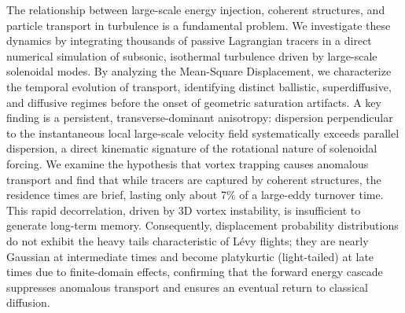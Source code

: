 \documentclass[]{article}
\begin{document}
The relationship between large-scale energy injection, coherent structures, and particle transport in turbulence is a fundamental problem. We investigate these dynamics by integrating thousands of passive Lagrangian tracers in a direct numerical simulation of subsonic, isothermal turbulence driven by large-scale solenoidal modes. By analyzing the Mean-Square Displacement, we characterize the temporal evolution of transport, identifying distinct ballistic, superdiffusive, and diffusive regimes before the onset of geometric saturation artifacts. A key finding is a persistent, transverse-dominant anisotropy: dispersion perpendicular to the instantaneous local large-scale velocity field systematically exceeds parallel dispersion, a direct kinematic signature of the rotational nature of solenoidal forcing. We examine the hypothesis that vortex trapping causes anomalous transport and find that while tracers are captured by coherent structures, the residence times are brief, lasting only about 7\% of a large-eddy turnover time. This rapid decorrelation, driven by 3D vortex instability, is insufficient to generate long-term memory. Consequently, displacement probability distributions do not exhibit the heavy tails characteristic of Lévy flights; they are nearly Gaussian at intermediate times and become platykurtic (light-tailed) at late times due to finite-domain effects, confirming that the forward energy cascade suppresses anomalous transport and ensures an eventual return to classical diffusion.
\end{document}

